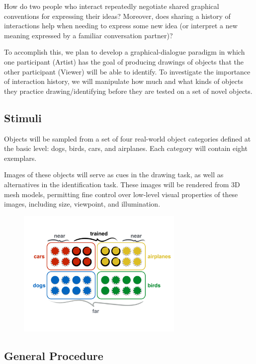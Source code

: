 \documentclass[12pt]{article}
\begin{document}
How do two people who interact repeatedly negotiate shared graphical conventions for expressing their ideas? Moreover, does sharing a history of interactions help when needing to express some new idea (or interpret a new meaning expressed by a familiar conversation partner)? 

To accomplish this, we plan to develop a graphical-dialogue paradigm in which one participant (Artist) has the goal of producing drawings of objects that the other participant (Viewer) will be able to identify. To investigate the importance of interaction history, we will manipulate how much and what kinds of objects they practice drawing/identifying before they are tested on a set of novel objects.

\subsection{Stimuli}

Objects will be sampled from a set of four real-world object categories defined at the basic level: dogs, birds, cars, and airplanes. Each category will contain eight exemplars. 

Images of these objects will serve as cues in the drawing task, as well as alternatives in the identification task. These images will be rendered from 3D mesh models, permitting fine control over low-level visual properties of these images, including size, viewpoint, and illumination. 

\begin{figure}[hbtp]
\begin{center}
\includegraphics[width=80mm]{figures/design.pdf}
\end{center}
\end{figure}
\vspace{-10mm}

\subsection{General Procedure}
\end{document}
